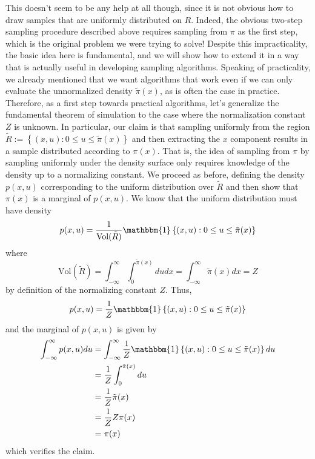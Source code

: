 \documentclass[12pt]{article}
\begin{document}
This doesn't seem to be any help at all though, since it is not obvious how to draw samples that are uniformly distributed on $R$. Indeed, the obvious two-step sampling procedure described 
above requires sampling from $\pi$ as the first step, which is the original problem we were trying to solve! Despite this impracticality, the basic idea here is fundamental, and we will show how 
to extend it in a way that is actually useful in developing sampling algorithms. Speaking of practicality, we already mentioned that we want algorithms that work even if we can only evaluate the 
unnormalized density  $\tilde{\pi}(x)$, as is often the case in practice. Therefore, as a first step towards practical algorithms, let's generalize the fundamental theorem of simulation to the case 
where the normalization constant $Z$ is unknown. In particular, our claim is that sampling uniformly from the region $\tilde{R} := \left\{(x, u): 0 \leq u \leq \tilde{\pi}(x) \right\}$ and then extracting the 
$x$ component results in a sample distributed according to $\pi(x)$. That is, the idea of sampling from $\pi$ by sampling uniformly under the density surface only requires knowledge of the density 
up to a normalizing constant. We proceed as before, defining the density $p(x, u)$ corresponding to the uniform distribution over $\tilde{R}$ and then show that $\pi(x)$ is a marginal of $p(x, u)$. 
We know that the uniform distribution must have density
\[p(x, u) = \frac{1}{\text{Vol}(\tilde{R})}\mathbbm{1}\left\{(x, u): 0 \leq u \leq \tilde{\pi}(x) \right\}\]
where 
\[ \text{Vol}(\tilde{R}) = \int_{-\infty}^{\infty} \int_{0}^{\tilde{\pi}(x)} du dx = \int_{-\infty}^{\infty} \tilde{\pi}(x) dx = Z \]
by definition of the normalizing constant $Z$. Thus, 
\[p(x, u) = \frac{1}{Z}\mathbbm{1}\left\{(x, u): 0 \leq u \leq \tilde{\pi}(x) \right\}\]
and the marginal of $p(x, u)$ is given by
\begin{align*}
\int_{-\infty}^{\infty} p(x, u) du &= \int_{-\infty}^{\infty} \frac{1}{Z}\mathbbm{1}\left\{(x, u): 0 \leq u \leq \tilde{\pi}(x) \right\} du \\
					     &= \frac{1}{Z} \int_{0}^{\tilde{\pi}(x)} du \\
					     &= \frac{1}{Z} \tilde{\pi}(x) \\
					     &= \frac{1}{Z} Z\pi(x) \\
					     &= \pi(x)
\end{align*}
which verifies the claim. 
\end{document}
